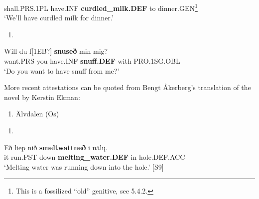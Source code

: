shall.PRS.1PL  have.INF  \textbf{curdled\_milk.DEF} to  dinner.GEN\footnote{ This is a fossilized “old” genitive, see 5.4.2.}  \\ %


‘We’ll have curdled milk for dinner.’
\z


\begin{enumerate} %
\item 
\end{enumerate} %
\ea\label{}
\gll Will  du  f[1EB?]  \textbf{snuseð} min  mig?\\


want.PRS  you  have.INF  \textbf{snuff.DEF} with  PRO.1SG.OBL\\ %


 ‘Do you want to have snuff from me?’
\z


More recent attestations can be quoted from Bengt Åkerberg’s translation of the novel  by Kerstin Ekman:

\begin{enumerate} %
\item 
\label{bkm:Ref113183734}Älvdalen (Os) 

\end{enumerate} %
\setcounter{listLFOxcviiileveli}{0}
\begin{enumerate} %
\item 
\end{enumerate} %
\ea\label{}
\gll Eð  liep  nið  \textbf{smeltwattneð} i  uäl\k{u}.  \\


it  run.PST  down  \textbf{melting\_water.DEF} in  hole.DEF.ACC  \\ %


‘Melting water was running down into the hole.’ [S9]
\z

